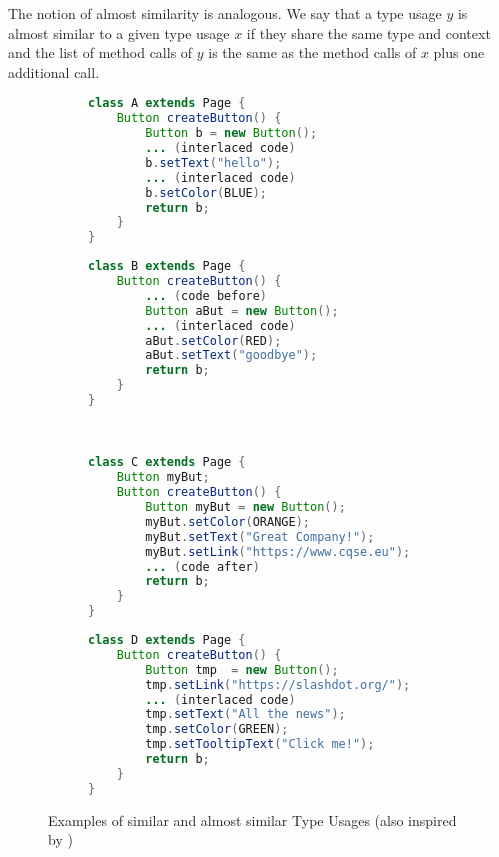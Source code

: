 The notion of almost similarity is analogous.
We say that a type usage $y$ is almost similar to a given type usage $x$ if they share the same type and context and the list of method calls of $y$ is the same as the method calls of $x$ plus one additional call.

\begin{figure}[h]
    \centering
    \begin{subfigure}[c]{0.47\textwidth}
        \begin{lstlisting}[language=java, frame=single, basicstyle=\footnotesize]
class A extends Page {
    Button createButton() {
        Button b = new Button();
        ... (interlaced code)
        b.setText("hello");
        ... (interlaced code)
        b.setColor(BLUE);
        return b;
    }
}
        \end{lstlisting}
    \end{subfigure}
    \quad
    \begin{subfigure}[c]{0.47\textwidth}
        \begin{lstlisting}[language=java, frame=single, basicstyle=\footnotesize]
class B extends Page {
    Button createButton() {
        ... (code before)
        Button aBut = new Button();
        ... (interlaced code)
        aBut.setColor(RED);
        aBut.setText("goodbye");
        return b;
    }
}
        \end{lstlisting}
    \end{subfigure}
    \\

    \begin{subfigure}[c]{0.47\textwidth}
        \begin{lstlisting}[language=java, frame=single, basicstyle=\footnotesize, showstringspaces=false]
class C extends Page {
    Button myBut;
    Button createButton() {
        Button myBut = new Button();
        myBut.setColor(ORANGE);
        myBut.setText("Great Company!");
        myBut.setLink("https://www.cqse.eu");
        ... (code after)
        return b;
    }
}
        \end{lstlisting}
    \end{subfigure}
    \quad
    \begin{subfigure}[c]{0.47\textwidth}
        \begin{lstlisting}[language=java, frame=single, basicstyle=\footnotesize, showstringspaces=false]
class D extends Page {
    Button createButton() {
        Button tmp  = new Button();
        tmp.setLink("https://slashdot.org/");
        ... (interlaced code)
        tmp.setText("All the news");
        tmp.setColor(GREEN);
        tmp.setTooltipText("Click me!");
        return b;
    }
}
        \end{lstlisting}
    \end{subfigure}

    \caption{Examples of similar and almost similar Type Usages (also inspired by \cite{monperrus2013detecting})}
    \label{fig:sim_asim}
\end{figure}

